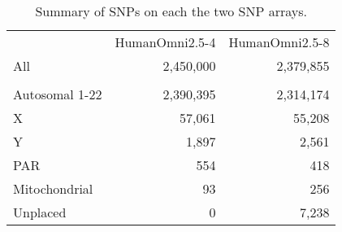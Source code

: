 \begin{table}[htp]
\centering
\begin{tabular}{lrr}
               & HumanOmni2.5-4 & HumanOmni2.5-8 \\
All            & 2,450,000      & 2,379,855      \\
               &                &                \\
Autosomal 1-22 & 2,390,395      & 2,314,174      \\
X              & 57,061         & 55,208         \\
Y              & 1,897          & 2,561          \\
PAR            & 554            & 418            \\
Mitochondrial  & 93             & 256            \\
Unplaced       & 0              & 7,238        
\end{tabular}
\caption{Summary of SNPs on each the two SNP arrays.}
\label{tab:chips_preQC_summary}
\end{table}
